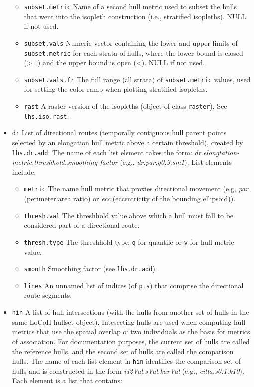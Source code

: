 \documentclass{article}
\begin{document}
\begin{itemize}
\begin{itemize}
      \item \texttt{subset.metric} Name of a second hull metric used to subset the hulls that went into the isopleth construction (i.e., stratified isopleths). NULL if not used.
      \item \texttt{subset.vals} Numeric vector containing the lower and upper limits of \texttt{subset.metric} for each strata of hulls, where the lower bound is closed (>=) and the upper bound is open (<). NULL if not used.
      \item \texttt{subset.vals.fr} The full range (all strata) of \texttt{subset.metric} values, used for setting the color ramp when plotting stratified isopleths.
      \item \texttt{rast} A raster version of the isopleths (object of class \texttt{raster}). See \texttt{lhs.iso.rast}.
    \end{itemize}
  

  \item \texttt{dr} List of directional routes (temporally contiguous hull parent points selected by an elongation hull metric above a certain threshold), created by \texttt{lhs.dr.add}. The name of each list element takes the form: \textit{dr.elongtation-metric.threshhold.smoothing-factor} (e.g., \textit{dr.par.q0.9.sm1}). List elements include:
  
    \begin{itemize}
      \item \texttt{metric} The name hull metric that proxies directional movement (e.g, \textit{par} (perimeter:area ratio) or \textit{ecc} (eccentricity of the bounding ellipsoid)).
      \item \texttt{thresh.val} The threshhold value above which a hull must fall to be considered part of a directional route.
      \item \texttt{thresh.type} The threshhold type: \texttt{q} for quantile or \texttt{v} for hull metric value.
      \item \texttt{smooth} Smoothing factor (see \texttt{lhs.dr.add}).
      \item \texttt{lines} An unnamed list of indices (of \texttt{pts}) that comprise the directional route segments.
    \end{itemize}

  \item \texttt{hin} A list of hull intersections (with the hulls from another set of hulls in the same LoCoH-hullset object).  Intesecting hulls are used when computing hull metrics that use the spatial overlap of two individuals as the basis for metrics of association. For documentation purposes, the current set of hulls are called the reference hulls, and the second set of hulls are called the comparison hulls. The name of each list element in \texttt{hin} identifies the comparison set of hulls and is constructed in the form \textit{id2Val.sVal.karVal} (e.g., \textit{cilla.s0.1.k10}). Each element is a list that contains:


\end{itemize}
\end{document}
